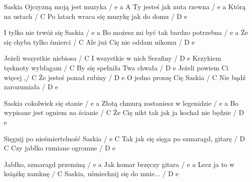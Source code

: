 Saskia
Ojczyzną moją jest muzyka / e a
A Ty jesteś jak nuta rzewna / e a
Którą na ustach / C
Po latach wraca się muzykę jak do domu / D e

I tylko nie trwóż się Saskia / e a
Bo możesz mi być tak bardzo potrzebna / e a
Że się chyba tylko śmierci / C
Ale już Cię nie oddam nikomu / D e

Jeżeli wszystkie niebiosa / C
I wszystkie w nich Serafiny / D e
Krzykiem tęsknoty wybłagam / C
By się spełniła Twa chwała / D e
Jeżeli powiem Ci więcej ,/ C
Że jesteś ponad rubiny / D e
O jedno proszę Cię Saskia / C
Nie bądź zarozumiała / D e

Saskia cokolwiek się stanie / e a
Złotą chmurą zostaniesz w legenidzie / e a
Bo wypisane jest ogniem na ścianie / C
Że Cię nikt tak jak ja kochał nie będzie / D e

Sięgnij po nieśmiertelność Saskia / e C
Tak jak się sięga po szmaragd, gitarę / D C
Czy jabłko rumiane ogromne / D e

Jabłko, szmaragd przeminą / e a
Jak komar brzęczy gitara / e a
Lecz ja to w książkę zamknę / C
Saskia, uśmiechnij się do mnie... / D e